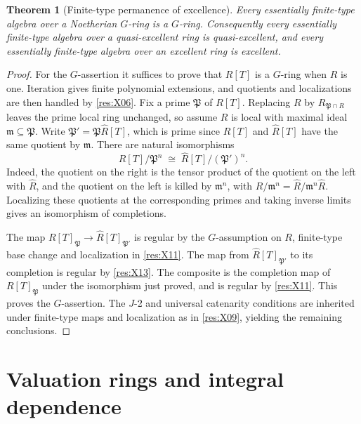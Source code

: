 \documentclass[11pt,oneside,openany]{book}
\newtheorem{theorem}{Theorem}[chapter]
\theoremstyle{definition}
\theoremstyle{remark}
\begin{document}
\begin{theorem}[Finite-type permanence of excellence]\label{res:X14}
Every essentially finite-type algebra over a Noetherian \(G\)-ring is a \(G\)-ring. Consequently every essentially finite-type algebra over a quasi-excellent ring is quasi-excellent, and every essentially finite-type algebra over an excellent ring is excellent.
\end{theorem}
\begin{proof}
For the \(G\)-assertion it suffices to prove that \(R[T]\) is a \(G\)-ring when \(R\) is one. Iteration gives finite polynomial extensions, and quotients and localizations are then handled by \ref{res:X06}. Fix a prime \(\mathfrak P\) of \(R[T]\). Replacing \(R\) by \(R_{\mathfrak P\cap R}\) leaves the prime local ring unchanged, so assume \(R\) is local with maximal ideal \(\mathfrak m\subseteq\mathfrak P\). Write \(\mathfrak P'=\mathfrak P\widehat R[T]\), which is prime since \(R[T]\) and \(\widehat R[T]\) have the same quotient by \(\mathfrak m\). There are natural isomorphisms
\[
    R[T]/\mathfrak P^n \;\cong\;
       \widehat R[T]/(\mathfrak P')^n .
\]
Indeed, the quotient on the right is the tensor product of the quotient on the left with \(\widehat R\), and the quotient on the left is killed by \(\mathfrak m^n\), with \(R/\mathfrak m^n=\widehat R/\mathfrak m^n\widehat R\). Localizing these quotients at the corresponding primes and taking inverse limits gives an isomorphism of completions.

The map \(R[T]_{\mathfrak P}\to\widehat R[T]_{\mathfrak P'}\) is regular by the \(G\)-assumption on \(R\), finite-type base change and localization in \ref{res:X11}. The map from \(\widehat R[T]_{\mathfrak P'}\) to its completion is regular by \ref{res:X13}. The composite is the completion map of \(R[T]_{\mathfrak P}\) under the isomorphism just proved, and is regular by \ref{res:X11}. This proves the \(G\)-assertion. The \(J\)-2 and universal catenarity conditions are inherited under finite-type maps and localization as in \ref{res:X09}, yielding the remaining conclusions.
\end{proof}

\section[Valuation rings]{Valuation rings and integral dependence}
\end{document}
